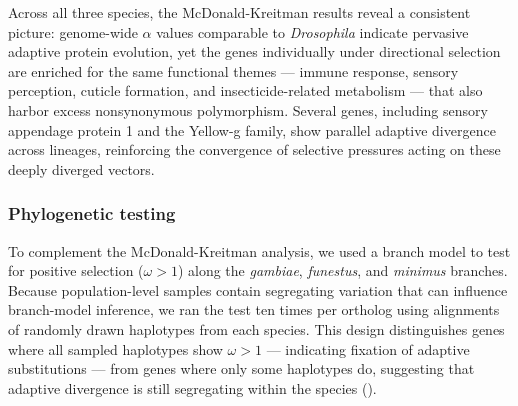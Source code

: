 Across all three species, the McDonald-Kreitman results reveal a consistent picture:
genome-wide $\alpha$ values comparable to \textit{Drosophila}
indicate pervasive adaptive protein evolution,
yet the genes individually under directional selection
are enriched for the same functional themes ---
immune response, sensory perception, cuticle formation,
and insecticide-related metabolism ---
that also harbor excess nonsynonymous polymorphism.
Several genes, including sensory appendage protein 1 and the Yellow-g family,
show parallel adaptive divergence across lineages,
reinforcing the convergence of selective pressures
acting on these deeply diverged vectors.





\subsubsection{Phylogenetic testing}

To complement the McDonald-Kreitman analysis,
we used a branch model \citep{yang2007paml} to test for positive selection
($\omega > 1$) along the \textit{gambiae}, \textit{funestus},
and \textit{minimus} branches.
Because population-level samples contain segregating variation
that can influence branch-model inference,
we ran the test ten times per ortholog
using alignments of randomly drawn haplotypes from each species.
This design distinguishes genes where all sampled haplotypes
show $\omega > 1$ --- indicating fixation of adaptive substitutions ---
from genes where only some haplotypes do,
suggesting that adaptive divergence is still segregating within the species ().

